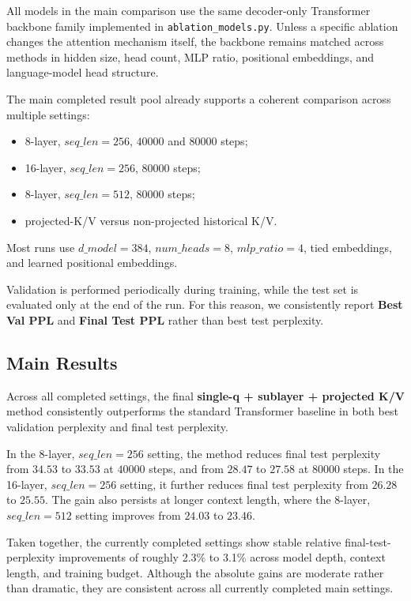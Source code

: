 \documentclass[11pt]{article}
\begin{document}
All models in the main comparison use the same decoder-only Transformer backbone family implemented in \texttt{ablation\_models.py}. Unless a specific ablation changes the attention mechanism itself, the backbone remains matched across methods in hidden size, head count, MLP ratio, positional embeddings, and language-model head structure.

The main completed result pool already supports a coherent comparison across multiple settings:
\begin{itemize}[leftmargin=1.5em]
    \item 8-layer, $seq\_len=256$, $40000$ and $80000$ steps;
    \item 16-layer, $seq\_len=256$, $80000$ steps;
    \item 8-layer, $seq\_len=512$, $80000$ steps;
    \item projected-K/V versus non-projected historical K/V.
\end{itemize}
Most runs use $d\_model=384$, $num\_heads=8$, $mlp\_ratio=4$, tied embeddings, and learned positional embeddings.

Validation is performed periodically during training, while the test set is evaluated only at the end of the run. For this reason, we consistently report \textbf{Best Val PPL} and \textbf{Final Test PPL} rather than best test perplexity.

\subsection{Main Results}

Across all completed settings, the final \textbf{single-q + sublayer + projected K/V} method consistently outperforms the standard Transformer baseline in both best validation perplexity and final test perplexity.

In the 8-layer, $seq\_len=256$ setting, the method reduces final test perplexity from $34.53$ to $33.53$ at $40000$ steps, and from $28.47$ to $27.58$ at $80000$ steps. In the 16-layer, $seq\_len=256$ setting, it further reduces final test perplexity from $26.28$ to $25.55$. The gain also persists at longer context length, where the 8-layer, $seq\_len=512$ setting improves from $24.03$ to $23.46$.

Taken together, the currently completed settings show stable relative final-test-perplexity improvements of roughly 2.3\% to 3.1\% across model depth, context length, and training budget. Although the absolute gains are moderate rather than dramatic, they are consistent across all currently completed main settings.
\end{document}
